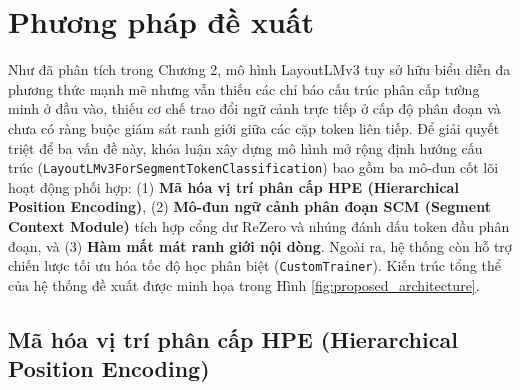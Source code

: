 \chapter{Phương pháp đề xuất}
Như đã phân tích trong Chương 2, mô hình LayoutLMv3 \cite{huang2022layoutlmv3} tuy sở hữu biểu diễn đa phương thức mạnh mẽ nhưng vẫn thiếu các chỉ báo cấu trúc phân cấp tường minh ở đầu vào, thiếu cơ chế trao đổi ngữ cảnh trực tiếp ở cấp độ phân đoạn và chưa có ràng buộc giám sát ranh giới giữa các cặp token liên tiếp. Để giải quyết triệt để ba vấn đề này, khóa luận xây dựng mô hình mở rộng định hướng cấu trúc (\texttt{LayoutLMv3For}\allowbreak\texttt{Segment}\allowbreak\texttt{Token}\allowbreak\texttt{Classification}) bao gồm ba mô-đun cốt lõi hoạt động phối hợp: (1) \textbf{Mã hóa vị trí phân cấp HPE (Hierarchical Position Encoding)}, (2) \textbf{Mô-đun ngữ cảnh phân đoạn SCM (Segment Context Module)} tích hợp cổng dư ReZero và nhúng đánh dấu token đầu phân đoạn, và (3) \textbf{Hàm mất mát ranh giới nội dòng}. Ngoài ra, hệ thống còn hỗ trợ chiến lược tối ưu hóa tốc độ học phân biệt (\texttt{CustomTrainer}). Kiến trúc tổng thể của hệ thống đề xuất được minh họa trong Hình \ref{fig:proposed_architecture}.



\section{Mã hóa vị trí phân cấp HPE (Hierarchical Position Encoding)}
